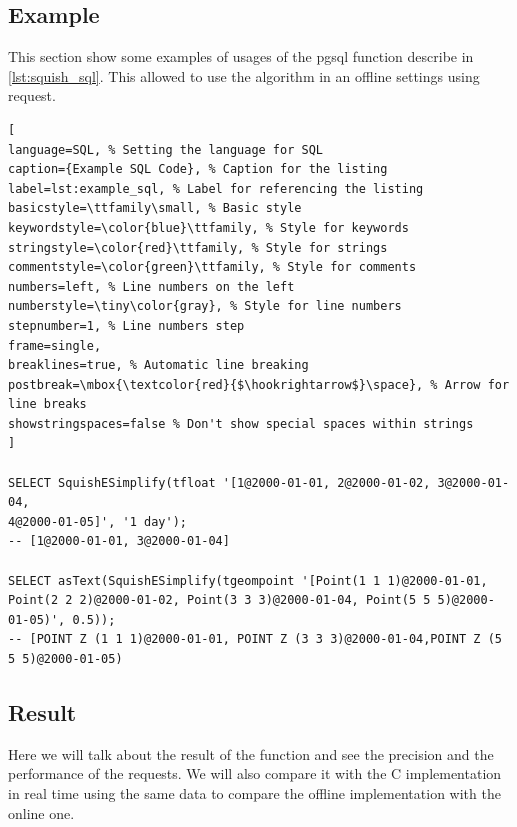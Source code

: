 \subsection{Example}
This section show some examples of usages of the pgsql function describe in \ref{lst:squish_sql}. This allowed to use the algorithm in an offline settings using request.
\begin{lstlisting}[
language=SQL, % Setting the language for SQL
caption={Example SQL Code}, % Caption for the listing
label=lst:example_sql, % Label for referencing the listing
basicstyle=\ttfamily\small, % Basic style
keywordstyle=\color{blue}\ttfamily, % Style for keywords
stringstyle=\color{red}\ttfamily, % Style for strings
commentstyle=\color{green}\ttfamily, % Style for comments
numbers=left, % Line numbers on the left
numberstyle=\tiny\color{gray}, % Style for line numbers
stepnumber=1, % Line numbers step
frame=single,
breaklines=true, % Automatic line breaking
postbreak=\mbox{\textcolor{red}{$\hookrightarrow$}\space}, % Arrow for line breaks
showstringspaces=false % Don't show special spaces within strings
]

SELECT SquishESimplify(tfloat '[1@2000-01-01, 2@2000-01-02, 3@2000-01-04,
4@2000-01-05]', '1 day');
-- [1@2000-01-01, 3@2000-01-04]

SELECT asText(SquishESimplify(tgeompoint '[Point(1 1 1)@2000-01-01,
Point(2 2 2)@2000-01-02, Point(3 3 3)@2000-01-04, Point(5 5 5)@2000-01-05)', 0.5));
-- [POINT Z (1 1 1)@2000-01-01, POINT Z (3 3 3)@2000-01-04,POINT Z (5 5 5)@2000-01-05)

\end{lstlisting}

\subsection{Result}

Here we will talk about the result of the function and see the precision and the performance of the requests. We will also compare it with the C implementation in real time using the same data to compare the offline implementation with the online one.

